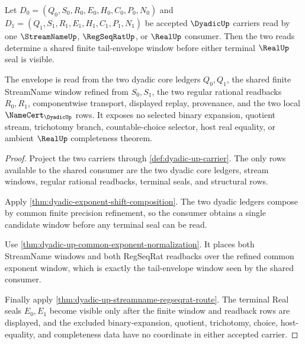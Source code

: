 \begin{theorem}
\label{thm:dyadic-up-common-window-tail-envelope}
Let $D_0=(Q_0,S_0,R_0,E_0,H_0,C_0,P_0,N_0)$ and $D_1=(Q_1,S_1,R_1,E_1,H_1,C_1,P_1,N_1)$ be accepted $\DyadicUp$ carriers read by one $\StreamNameUp$, $\RegSeqRatUp$, or $\RealUp$ consumer. Then the two reads determine a shared finite tail-envelope window before either terminal $\RealUp$ seal is visible.

The envelope is read from the two dyadic core ledgers $Q_0,Q_1$, the shared finite StreamName window refined from $S_0,S_1$, the two regular rational readbacks $R_0,R_1$, componentwise transport, displayed replay, provenance, and the two local $\NameCert_{\DyadicUp}$ rows. It exposes no selected binary expansion, quotient stream, trichotomy branch, countable-choice selector, host real equality, or ambient $\RealUp$ completeness theorem.
\end{theorem}
\begin{proof}
Project the two carriers through \autoref{def:dyadic-up-carrier}. The only rows available to the shared consumer are the two dyadic core ledgers, stream windows, regular rational readbacks, terminal seals, and structural rows.

Apply \autoref{thm:dyadic-exponent-shift-composition}. The two dyadic ledgers compose by common finite precision refinement, so the consumer obtains a single candidate window before any terminal seal can be read.

Use \autoref{thm:dyadic-up-common-exponent-normalization}. It places both StreamName windows and both RegSeqRat readbacks over the refined common exponent window, which is exactly the tail-envelope window seen by the shared consumer.

Finally apply \autoref{thm:dyadic-up-streamname-regseqrat-route}. The terminal Real seals $E_0,E_1$ become visible only after the finite window and readback rows are displayed, and the excluded binary-expansion, quotient, trichotomy, choice, host-equality, and completeness data have no coordinate in either accepted carrier.
\end{proof}

